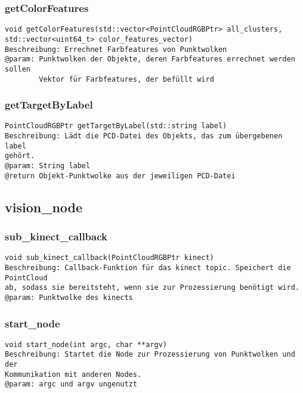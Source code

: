 \documentclass{suturo}
\begin{document}
\subsubsection{getColorFeatures}
\begin{verbatim}
void getColorFeatures(std::vector<PointCloudRGBPtr> all_clusters,
std::vector<uint64_t> color_features_vector)
Beschreibung: Errechnet Farbfeatures von Punktwolken
@param: Punktwolken der Objekte, deren Farbfeatures errechnet werden sollen
	    Vektor für Farbfeatures, der befüllt wird
\end{verbatim}\label{func:getcolorfeatures}

\subsubsection{getTargetByLabel}
\begin{verbatim}
PointCloudRGBPtr getTargetByLabel(std::string label)
Beschreibung: Lädt die PCD-Datei des Objekts, das zum übergebenen label
gehört.
@param: String label
@return Objekt-Punktwolke aus der jeweiligen PCD-Datei
\end{verbatim}\label{func:gettargetbylabel}


\subsection*{vision\_node}
\subsubsection{sub\_kinect\_callback}
\begin{verbatim}
void sub_kinect_callback(PointCloudRGBPtr kinect)
Beschreibung: Callback-Funktion für das kinect topic. Speichert die PointCloud
ab, sodass sie bereitsteht, wenn sie zur Prozessierung benötigt wird.
@param: Punktwolke des kinects
\end{verbatim}\label{func:subkinectcallback}
\subsubsection{start\_node}
\begin{verbatim}
void start_node(int argc, char **argv)
Beschreibung: Startet die Node zur Prozessierung von Punktwolken und der
Kommunikation mit anderen Nodes.
@param: argc und argv ungenutzt
\end{verbatim}\label{func:startnode}
\end{document}

